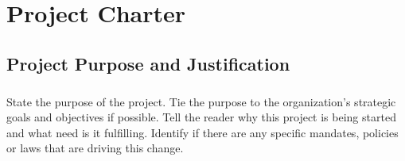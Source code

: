 \chapter{Project Charter}
\section{Project Purpose and Justification}
\paragraph{} State the purpose of the project.  Tie the purpose to the organization's strategic goals and objectives if possible.  Tell the reader why this project is being started and what need is it fulfilling.  Identify if there are any specific mandates, policies or laws that are driving this change.



